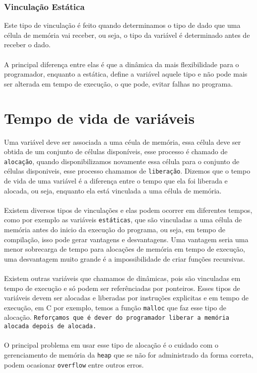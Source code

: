 \documentclass[12pt, onecolumn]{article}
\begin{document}
		\subsubsection{\hspace{1cm}Vinculação Estática}
	Este tipo de vinculação é feito quando determinamos o tipo de dado que 
	uma célula de memória vai receber, ou seja, o tipo da variável é determinado
	antes de receber o dado.\\
	\\
	A principal diferença entre elas é que a dinâmica da mais flexibilidade 
	para o programador, enquanto a estática, define a variável aquele tipo e 
	não pode mais ser alterada em tempo de execução, o que pode, evitar falhas
	no programa.
	
		\section{Tempo de vida de variáveis}
	
	Uma variável deve ser associada a uma céula de memória, essa célula deve
	ser obtida de um conjunto de células disponíveis, esse processo é chamado
	de \texttt{alocação}, quando disponibilizamos novamente essa célula
	para o conjunto de células disponiveis, esse processo chamamos de
	\texttt{liberação}. Dizemos que o tempo de vida de uma variável é 
	a diferença entre o tempo que ela foi liberada e alocada, ou seja, 
	enquanto ela está vinculada a uma célula de memória.\\
	\\
	Existem diversos tipos de vinculações e elas podem ocorrer em diferentes
	tempos, como por exemplo as variáveis \texttt{estáticas}, que são 
	vinculadas a uma célula de memória antes do inicio da execução do programa,
	ou seja, em tempo de compilação, isso pode gerar vantagens e desvantagens.
	Uma vantagem seria uma menor sobrecarga de tempo para alocações de memória
	em tempo de execução, uma desvantagem muito grande é a impossibilidade
	de criar funções recursivas.\\
	\\
	Existem outras variáveis que chamamos de dinâmicas, pois são vinculadas
	em tempo de execução e só podem ser referênciadas por ponteiros. 
	Esses tipos de variáveis devem ser alocadas e liberadas por instruções
	explicitas e em tempo de execução, em C por exemplo, temos a função 
	\texttt{malloc}	que faz esse tipo de alocação. \texttt{Reforçamos que é dever
	do programador liberar a memória alocada depois de alocada.}\\
	\\
	O principal problema em usar esse tipo de alocação é o cuidado com o 
	gerenciamento de memória da \texttt{heap} que se não for administrado
	da forma correta, podem ocasionar \texttt{overflow} entre outros erros.
\end{document}
